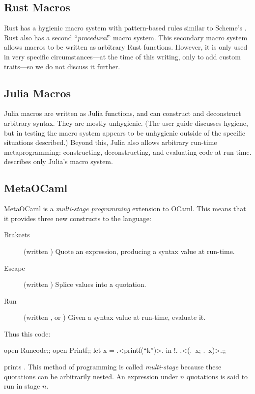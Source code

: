 \subsection{Rust Macros}

Rust has a hygienic macro system with pattern-based rules similar to
Scheme's . Rust also has a second
``\emph{procedural}'' macro system. This secondary macro system allows
macros to be written as arbitrary Rust functions. However, it is only
used in very specific circumstances---at the time of this writing,
only to add custom  traits---so we do not discuss it
further.

\subsection{Julia Macros}

Julia macros are written as Julia functions, and can construct and
deconstruct arbitrary syntax. They are mostly unhygienic. (The user
guide discusses hygiene, but in testing the macro system appears to be unhygienic
outside of the specific situations described.) Beyond this, Julia also
allows arbitrary run-time metaprogramming: constructing,
deconstructing, and evaluating code at run-time.
 describes only Julia's macro system.

\subsection{MetaOCaml} \label{sec:taxonomy-metaocaml}

MetaOCaml is a \emph{multi-stage programming} extension to OCaml. This
means that it provides three new constructs to the language:
\begin{description}
\item[Brakcets] (written ) Quote an expression,
  producing a syntax value at run-time.
\item[Escape] (written ) Splice values into a quotation.
\item[Run] (written , or ) Given a syntax value at
  run-time, evaluate it.
\end{description}
Thus this code:
\begin{Codes}
open Runcode;;
open Printf;;
let x = .<printf(``k'')>. in !. .<(.~x; .~x)>.;;
\end{Codes}
prints . This method of programming is called
\emph{multi-stage} because these quotations can be arbitrarily
nested. An expression under $n$ quotations is said to run in stage
$n$.

